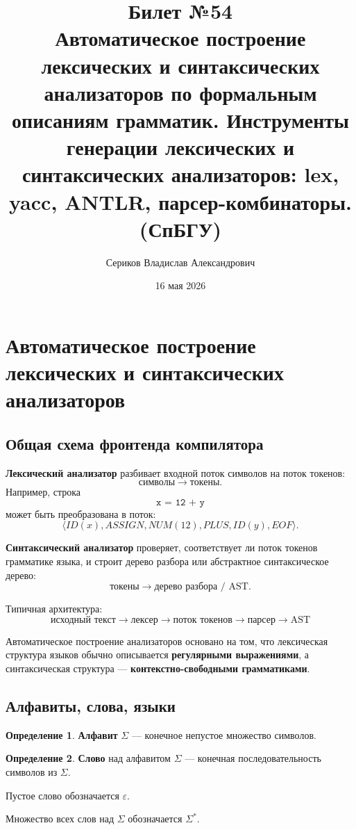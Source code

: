 \documentclass[12pt,a4paper]{article}
\title{Билет №54 \\ \small Автоматическое построение лексических и синтаксических анализаторов по формальным описаниям грамматик. Инструменты генерации лексических и синтаксических анализаторов: lex, yacc, ANTLR, парсер-комбинаторы. (СпБГУ)}
\author{Сериков Владислав Александрович}
\date{16 мая 2026}
\theoremstyle{definition}
\newtheorem{definition}{Определение}
\theoremstyle{plain}
\begin{document}
\maketitle
\tableofcontents
\newpage

\section{Автоматическое построение лексических и синтаксических анализаторов}

\subsection{Общая схема фронтенда компилятора}

\textbf{Лексический анализатор} разбивает входной поток символов на поток токенов:
\[
\text{символы} \longrightarrow \text{токены}.
\]
Например, строка
\[
\texttt{x = 12 + y}
\]
может быть преобразована в поток:
\[
\langle ID(x), ASSIGN, NUM(12), PLUS, ID(y), EOF\rangle.
\]

\textbf{Синтаксический анализатор} проверяет, соответствует ли поток токенов грамматике языка, и строит дерево разбора или абстрактное синтаксическое дерево:
\[
\text{токены} \longrightarrow \text{дерево разбора / AST}.
\]

Типичная архитектура:
\[
\boxed{
\text{исходный текст}
\to
\text{лексер}
\to
\text{поток токенов}
\to
\text{парсер}
\to
\text{AST}
}
\]

Автоматическое построение анализаторов основано на том, что лексическая структура языков обычно описывается \textbf{регулярными выражениями}, а синтаксическая структура --- \textbf{контекстно-свободными грамматиками}.

\subsection{Алфавиты, слова, языки}

\begin{definition}
\textbf{Алфавит} $\Sigma$ --- конечное непустое множество символов.
\end{definition}

\begin{definition}
\textbf{Слово} над алфавитом $\Sigma$ --- конечная последовательность символов из $\Sigma$.
\end{definition}

Пустое слово обозначается $\varepsilon$.

Множество всех слов над $\Sigma$ обозначается $\Sigma^*$.
\end{document}
